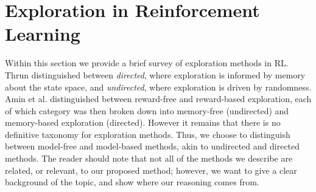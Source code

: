 


\section{Exploration in Reinforcement Learning}
Within this section we provide a brief survey of exploration methods in RL.  Thrun \cite{Thrun-1992-15850} distinguished between \textit{directed}, where exploration is informed by memory about the state space, and \textit{undirected}, where exploration is driven by randomness. Amin et al. \cite{DBLP:journals/corr/abs-2109-00157} distinguished between reward-free and reward-based exploration, each of which category was then broken down into memory-free (undirected) and memory-based exploration (directed). However it remains that there is no definitive taxonomy for exploration methods. Thus, we choose to distinguish between model-free and model-based methods, akin to undirected and directed methods. The reader should note that not all of the methods we describe are related, or relevant, to our proposed method; however, we want to give a clear background of the topic, and show where our reasoning comes from.

